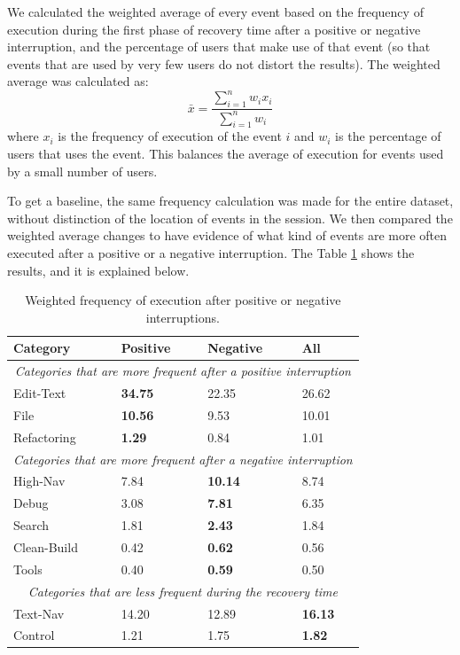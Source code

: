 We calculated the weighted average of every event based on the frequency of execution during the first phase of recovery time after a positive or negative interruption, and the percentage of users that make use of that event (so that events that are used by very few users do not distort the results). The weighted average was calculated as: $$\bar{x} = \frac{\sum_{i=1}^{n}w_ix_i}{\sum_{i=1}^{n}w_i} $$where $x_i$ is the frequency of execution of the event $i$ and $w_i$ is the percentage of users that uses the event. This balances the average of execution for events used by a small number of users. 

To get a baseline, the same frequency calculation was made for the entire dataset, without distinction of the location of events in the session. We then compared the weighted average changes to have evidence of what kind of events are more often executed after a positive or a negative interruption. The Table \ref{tbl:stats_events} shows the results, and it is explained below.

\begin{table}[ht!]
	\small
	\caption{Weighted frequency of execution after positive or negative interruptions. }
	\label{tbl:stats_events}
	\centering
	\begin{tabular}{p{3cm}|p{2cm}|p{2cm}|p{2cm}} 
		\hline
		Category & Positive & Negative & All \\  
		\hline 
		\hline
		\multicolumn{4}{c}{\textit{Categories that are more frequent after a positive interruption}} \\
		\hline 
		Edit-Text &  \textbf{34.75} & 22.35 & 26.62 \\
		File &  \textbf{10.56} & 9.53 & 10.01\\
		Refactoring & \textbf{1.29} & 0.84 & 1.01 \\
		\hline 
		\multicolumn{4}{c}{\textit{Categories that are more frequent after a negative interruption}} \\
		\hline 
		High-Nav & 7.84 & \textbf{10.14} & 8.74  \\
		Debug & 3.08 & \textbf{7.81} & 6.35  \\
		Search & 1.81 & \textbf{2.43} & 1.84 \\
		Clean-Build & 0.42 & \textbf{0.62} & 0.56  \\
		Tools & 0.40 & \textbf{0.59} & 0.50 \\
		\hline 
		\multicolumn{4}{c}{\textit{Categories that are less frequent during the recovery time}} \\
		\hline 
		Text-Nav & 14.20 & 12.89 & \textbf{16.13} \\
		Control & 1.21 & 1.75 & \textbf{1.82} \\
		\hline
	\end{tabular}
\end{table}


